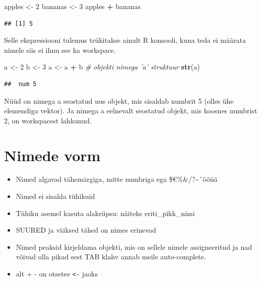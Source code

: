 \documentclass[]{book}
\newcommand{\euro}{€}
\newenvironment{Shaded}{\begin{snugshade}}{\end{snugshade}}
\newcommand{\KeywordTok}[1]{\textcolor[rgb]{0.13,0.29,0.53}{\textbf{#1}}}
\newcommand{\DecValTok}[1]{\textcolor[rgb]{0.00,0.00,0.81}{#1}}
\newcommand{\StringTok}[1]{\textcolor[rgb]{0.31,0.60,0.02}{#1}}
\newcommand{\CommentTok}[1]{\textcolor[rgb]{0.56,0.35,0.01}{\textit{#1}}}
\newcommand{\OperatorTok}[1]{\textcolor[rgb]{0.81,0.36,0.00}{\textbf{#1}}}
\newcommand{\NormalTok}[1]{#1}
\providecommand{\tightlist}{%
  \setlength{\itemsep}{0pt}\setlength{\parskip}{0pt}}
\begin{document}
\begin{Shaded}
\begin{Highlighting}[]
\NormalTok{apples <-}\StringTok{ }\DecValTok{2}
\NormalTok{bananas <-}\StringTok{ }\DecValTok{3}
\NormalTok{apples }\OperatorTok{+}\StringTok{ }\NormalTok{bananas}
\end{Highlighting}
\end{Shaded}

\begin{verbatim}
## [1] 5
\end{verbatim}

Selle ekspressiooni tulemus trükitakse ainult R konsooli, kuna teda ei
määrata nimele siis ei ilmu see ka workspace.

\begin{Shaded}
\begin{Highlighting}[]
\NormalTok{a <-}\StringTok{ }\DecValTok{2}
\NormalTok{b <-}\StringTok{ }\DecValTok{3}
\NormalTok{a <-}\StringTok{ }\NormalTok{a }\OperatorTok{+}\StringTok{ }\NormalTok{b}
\CommentTok{# objekti nimega 'a' struktuur}
\KeywordTok{str}\NormalTok{(a)}
\end{Highlighting}
\end{Shaded}

\begin{verbatim}
##  num 5
\end{verbatim}

Nüüd on nimega a seostatud uus objekt, mis sisaldab numbrit 5 (olles ühe
elemendiga vektor). Ja nimega a eelnevalt seostatud objekt, mis koosnes
numbrist 2, on workspacest lahkunud.

\section{Nimede vorm}\label{nimede-vorm}

\begin{itemize}
\tightlist
\item
  Nimed algavad tähemärgiga, mitte numbriga ega
  \$\euro{}\%\&/?\textasciitilde{}ˇöõüä
\item
  Nimed ei sisalda tühikuid
\item
  Tühiku asemel kasuta alakriipsu: näiteks eriti\_pikk\_nimi
\item
  SUURED ja väiksed tähed on nimes erinevad
\item
  Nimed peaksid kirjeldama objekti, mis on sellele nimele assigneeritud
  ja nad võivad olla pikad sest TAB klahv annab meile auto-complete.
\item
  alt + - on otsetee \texttt{\textless{}-} jaoks
\end{itemize}
\end{document}
